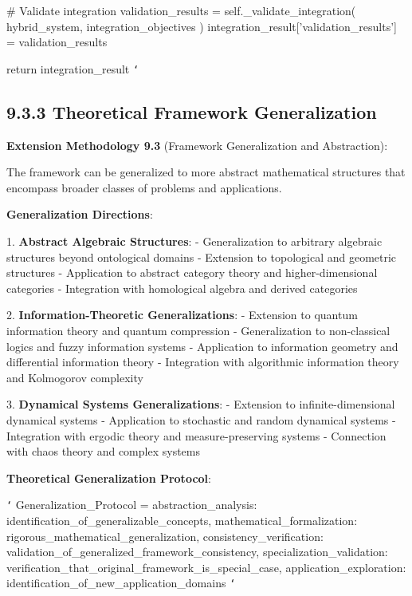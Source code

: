         \# Validate integration
        validation_results = self._validate_integration(
            hybrid_system, integration_objectives
        )
        integration_result['validation_results'] = validation_results
        
        return integration_result
\texttt{`}

\subsection{9.3.3 Theoretical Framework Generalization}

\textbf{Extension Methodology 9.3} (Framework Generalization and Abstraction):

The framework can be generalized to more abstract mathematical structures that encompass broader classes of problems and applications.

\textbf{Generalization Directions}:

1. \textbf{Abstract Algebraic Structures}:
   - Generalization to arbitrary algebraic structures beyond ontological domains
   - Extension to topological and geometric structures
   - Application to abstract category theory and higher-dimensional categories
   - Integration with homological algebra and derived categories

2. \textbf{Information-Theoretic Generalizations}:
   - Extension to quantum information theory and quantum compression
   - Generalization to non-classical logics and fuzzy information systems
   - Application to information geometry and differential information theory
   - Integration with algorithmic information theory and Kolmogorov complexity

3. \textbf{Dynamical Systems Generalizations}:
   - Extension to infinite-dimensional dynamical systems
   - Application to stochastic and random dynamical systems
   - Integration with ergodic theory and measure-preserving systems
   - Connection with chaos theory and complex systems

\textbf{Theoretical Generalization Protocol}:

\texttt{`}
Generalization_Protocol = {
    abstraction_analysis: identification_of_generalizable_concepts,
    mathematical_formalization: rigorous_mathematical_generalization,
    consistency_verification: validation_of_generalized_framework_consistency,
    specialization_validation: verification_that_original_framework_is_special_case,
    application_exploration: identification_of_new_application_domains
}
\texttt{`}

